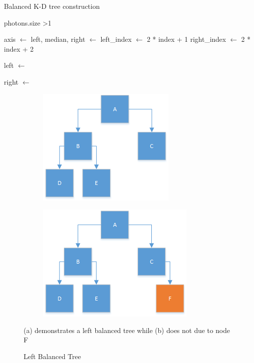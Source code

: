 \begin{algorithm}
\begin{algorithmic}
\caption{Balanced K-D tree construction}
\label{alg:balance}
\label{alg:balance}
\If
{
photons.size \textgreater 1
}
{
	\State axis $\gets$ 
	\State left, median, right $\gets$ 
	\State left\_index  $\gets$ 2 * index + 1
	\State right\_index $\gets$ 2 * index + 2

		\State left $\gets$ 
	\EndIf

		\State right $\gets$ 
	\EndIf

}
\Else
{

}
\EndIf
\EndFunction

\end{algorithmic}
\end{algorithm}

\begin{figure}
\centering
\begin{subfigure}{0.4\textwidth}
\includegraphics[scale=0.8]{./images/left-balanced-tree.png}
\caption{}
\end{subfigure}
\begin{subfigure}{0.4\textwidth}
\includegraphics[scale=0.8]{./images/non-left-balanced-tree.png}
\caption{}
\end{subfigure}
\caption{Left Balanced Tree}{(a) demonstrates a left balanced tree while (b) does not due to node F}
\end{figure}

